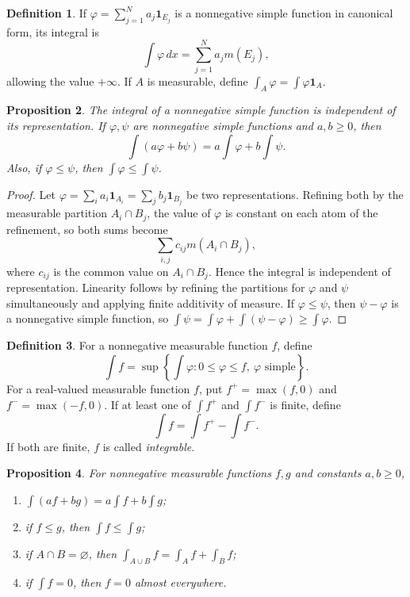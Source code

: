 \documentclass[11pt,openany]{book}
\numberwithin{equation}{chapter}
\theoremstyle{definition}
\newtheorem{definition}{Definition}[chapter]
\theoremstyle{plain}
\newtheorem{proposition}[definition]{Proposition}
\theoremstyle{remark}
\newcommand{\1}{\mathbf{1}}
\newcommand{\dd}{\,d}
\begin{document}
\begin{definition}
If \(\varphi=\sum_{j=1}^N a_j\1_{E_j}\) is a nonnegative simple function in canonical form, its integral is
\[
    \int \varphi\dd x=\sum_{j=1}^N a_jm(E_j),
\]
allowing the value \(+\infty\).  If \(A\) is measurable, define \(\int_A\varphi=\int \varphi\1_A\).
\end{definition}

\begin{proposition}
The integral of a nonnegative simple function is independent of its representation.  If \(\varphi,\psi\) are nonnegative simple functions and \(a,b\ge0\), then
\[
    \int(a\varphi+b\psi)=a\int\varphi+b\int\psi.
\]
Also, if \(\varphi\le\psi\), then \(\int\varphi\le\int\psi\).
\end{proposition}

\begin{proof}
Let \(\varphi=\sum_i a_i\1_{A_i}=\sum_j b_j\1_{B_j}\) be two representations.  Refining both by the measurable partition \(A_i\cap B_j\), the value of \(\varphi\) is constant on each atom of the refinement, so both sums become
\[
    \sum_{i,j} c_{ij}m(A_i\cap B_j),
\]
where \(c_{ij}\) is the common value on \(A_i\cap B_j\).  Hence the integral is independent of representation.  Linearity follows by refining the partitions for \(\varphi\) and \(\psi\) simultaneously and applying finite additivity of measure.  If \(\varphi\le\psi\), then \(\psi-\varphi\) is a nonnegative simple function, so \(\int\psi=\int\varphi+
\int(\psi-\varphi)\ge\int\varphi\).
\end{proof}

\begin{definition}
For a nonnegative measurable function \(f\), define
\[
    \int f=\sup\left\{\int\varphi:0\le\varphi\le f,\ \varphi\text{ simple}\right\}.
\]
For a real-valued measurable function \(f\), put \(f^+=\max(f,0)\) and \(f^-=
\max(-f,0)\).  If at least one of \(\int f^+\) and \(\int f^-\) is finite, define
\[
    \int f=\int f^+-\int f^-.
\]
If both are finite, \(f\) is called \emph{integrable}.
\end{definition}

\begin{proposition}
For nonnegative measurable functions \(f,g\) and constants \(a,b\ge0\),
\begin{enumerate}[label=(\roman*)]
    \item \(\int(af+bg)=a\int f+b\int g\);
    \item if \(f\le g\), then \(\int f\le\int g\);
    \item if \(A\cap B=\varnothing\), then \(\int_{A\cup B}f=\int_Af+\int_Bf\);
    \item if \(\int f=0\), then \(f=0\) almost everywhere.
\end{enumerate}
\end{proposition}
\end{document}
